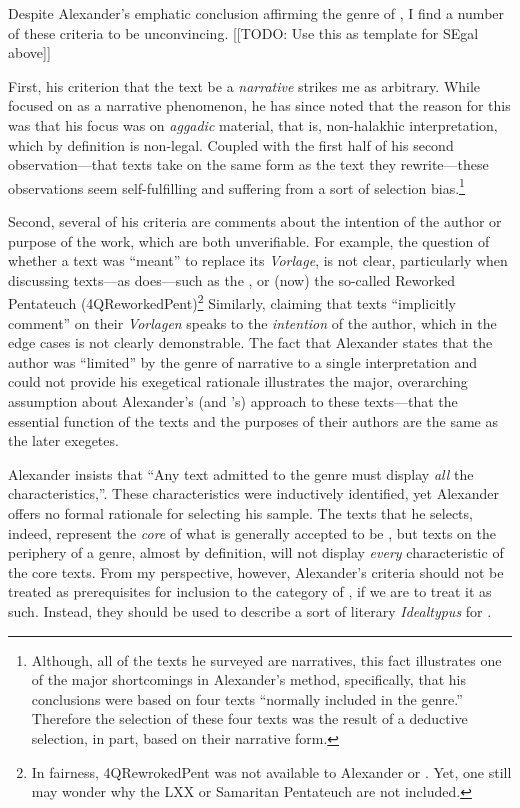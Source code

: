  Despite Alexander's emphatic conclusion affirming the genre of \RwB, I find a number of these criteria to be unconvincing. [[TODO: Use this as template for SEgal above]]

 First, his criterion that the text be a \emph{narrative} strikes me as arbitrary. While \vermes focused on \rwb as a narrative phenomenon, he has since noted that the reason for this was that his focus was on \emph{aggadic} material, that is, non-halakhic interpretation, which by definition is non-legal. Coupled with the first half of his second observation---that \rwb texts take on the same form as the text they rewrite---these observations seem self-fulfilling and suffering from a sort of selection bias.\footnote{Although,   all of the texts he surveyed are narratives, this fact illustrates one   of the major shortcomings in Alexander's method, specifically, that   his conclusions were based on four texts ``normally included in the   genre.''\autocite[99]{alexander_carson-williamson1988} Therefore the   selection of these four texts was the result of a deductive selection,   in part, based on their narrative form.} 

 Second, several of his criteria are comments about the intention of the author or purpose of the work, which are both unverifiable. For example, the question of whether a \rwb text was ``meant'' to replace its \emph{Vorlage}, is not clear, particularly when discussing texts---as \vermes does---such as the \pTarg, or (now) the so-called Reworked Pentateuch (4QReworkedPent)\footnote{In fairness, 4QRewrokedPent was not available   to Alexander or \vermes. Yet, one still may wonder why   the LXX or Samaritan Pentateuch are not included.} Similarly, claiming that \rwb texts ``implicitly comment'' on their \emph{Vorlagen} speaks to the \emph{intention} of the author, which in the edge cases is not clearly demonstrable. The fact that Alexander states that the author was ``limited'' by the genre of narrative to a single interpretation and could not provide his exegetical rationale illustrates the major, overarching assumption about Alexander's (and \vermes's) approach to these texts---that the essential function of the texts and the purposes of their authors are the same as the later exegetes. 

 Alexander insists that ``Any text admitted to the genre must display \emph{all} the characteristics,''\autocite[119 n. 11]{alexander_carson-williamson1988}. These characteristics were inductively identified, yet Alexander offers no formal rationale for selecting his sample. The texts that he selects, indeed, represent the \emph{core} of what is generally accepted to be \rwb, but texts on the periphery of a genre, almost by definition, will not display \emph{every} characteristic of the core texts. From my perspective, however, Alexander's criteria should not be treated as prerequisites for inclusion to the category of \rwb, if we are to treat it as such. Instead, they should be used to describe a sort of literary \emph{Idealtypus} for \rwb. 

